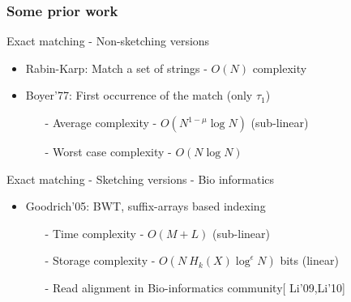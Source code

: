 \documentclass[10pt,xcolor=table]{beamer}
\begin{document}
\begin{frame} \frametitle{Some prior work}
	\vspace{-0.2cm}
	 \begin{block}{Exact matching - Non-sketching versions}	 	
	 	\begin{itemize}
            \item  {Rabin-Karp}: Match a set of strings - $O(N)$ complexity
	 		\item  {Boyer'77}: First occurrence of the match (only $\tau_1$)	 		
	 		\begin{itemize}
	 			\item[-] Average complexity - $O(N^{1-\mu} \log N)$ (sub-linear)
	 			\item[-] Worst case complexity - $O(N \log N)$
	 		\end{itemize}	
	 	\end{itemize}
	 \end{block}
	
	 \begin{block}{Exact matching - Sketching versions - Bio informatics} 	
	 	\begin{itemize}
	 		\item  {Goodrich'05}: BWT, suffix-arrays based indexing
	 		\begin{itemize}
	 			\item[-] Time complexity - $O(M + L)$ (sub-linear)
	 			\item[-] Storage complexity - $O(N~H_k(X) \log^\epsilon N)$ bits  (linear)
	 			\item[-] Read alignment in Bio-informatics community[ {\color{blue}Li'09,Li'10}]
	 		\end{itemize}	 		
	 	\end{itemize}
	 \end{block}
\end{frame}
\end{document}
